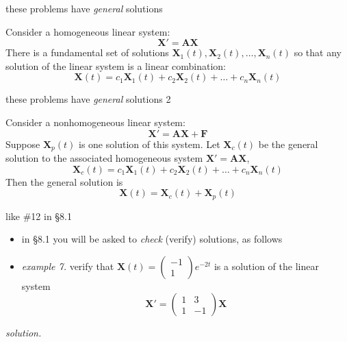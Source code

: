 \documentclass[dvipsnames,colorlinks]{beamer}
\newcommand{\bA}{\mathbf{A}}
\newcommand{\bF}{\mathbf{F}}
\newcommand{\bX}{\mathbf{X}}
\begin{document}
\begin{frame}{these problems have \emph{general} solutions}

\begin{theorem}  Consider a \alert{homogeneous} linear system:
    $$\bX' = \bA \bX$$
There is a \alert{fundamental set} of solutions $\bX_1(t), \bX_2(t), \dots, \bX_n(t)$ so that any solution of the linear system is a linear combination:
    $$\bX(t) = c_1 \bX_1(t) + c_2 \bX_2(t) + \dots + c_n \bX_n(t)$$
\end{theorem}
\end{frame}


\begin{frame}{these problems have \emph{general} solutions 2}

\begin{theorem}  Consider a \alert{non}homogeneous linear system:
    $$\bX' = \bA \bX + \bF$$
Suppose $\bX_p(t)$ is one solution of this system.  Let $\bX_c(t)$ be the general solution to the associated homogeneous system $\bX' = \bA \bX$,
    $$\bX_c(t) = c_1 \bX_1(t) + c_2 \bX_2(t) + \dots + c_n \bX_n(t)$$
Then the general solution is
    $$\bX(t) = \bX_c(t) + \bX_p(t)$$
\end{theorem}
\end{frame}


\begin{frame}{like \#12 in \S8.1}

\begin{itemize}
\item in \S8.1 you will be asked to \emph{check} (verify) solutions, as follows
\item \emph{example 7.}  verify that $\displaystyle \bX(t)=\begin{pmatrix} -1 \\ 1 \end{pmatrix} e^{-2t}$ is a solution of the linear system
    $$\bX' = \begin{pmatrix} 1 & 3 \\ 1 & -1 \end{pmatrix} \bX$$
\end{itemize}

\noindent \emph{solution.}

\vspace{35mm}
\end{frame}
\end{document}
